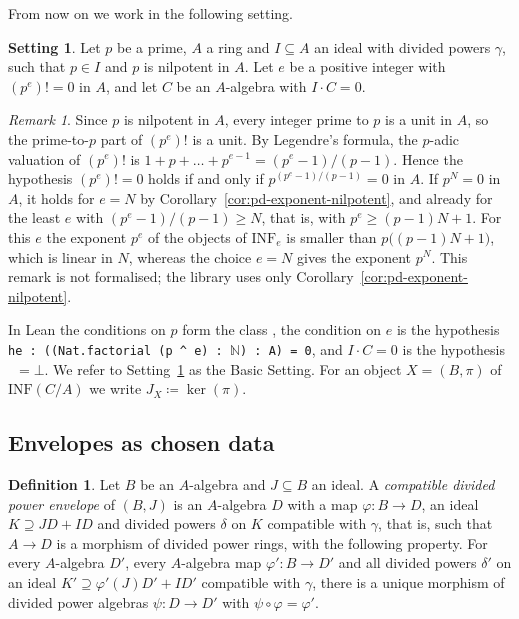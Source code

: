 \documentclass[11pt]{amsart}
\newcommand{\INF}{\mathrm{INF}}
\theoremstyle{plain}
\theoremstyle{definition}
\newtheorem{definition}[theorem]{Definition}
\newtheorem{setting}[theorem]{Setting}
\theoremstyle{remark}
\newtheorem{remark}[theorem]{Remark}
\begin{document}
From now on we work in the following setting.

\begin{setting}\label{Setting:s}
Let $p$ be a prime, $A$ a ring and $I \subseteq A$ an ideal with divided powers $\gamma$, such that $p \in I$ and $p$ is nilpotent in $A$. Let $e$ be a positive integer with $(p^e)! = 0$ in $A$, and let $C$ be an $A$-algebra with $I \cdot C = 0$.
\end{setting}

\begin{remark}\label{rem:valuation}
Since $p$ is nilpotent in $A$, every integer prime to $p$ is a unit in $A$, so the prime-to-$p$ part of $(p^e)!$ is a unit. By Legendre's formula, the $p$-adic valuation of $(p^e)!$ is $1 + p + \dots + p^{e-1} = (p^e-1)/(p-1)$. Hence the hypothesis $(p^e)! = 0$ holds if and only if $p^{(p^e-1)/(p-1)} = 0$ in $A$. If $p^N = 0$ in $A$, it holds for $e = N$ by Corollary~\ref{cor:pd-exponent-nilpotent}, and already for the least $e$ with $(p^e-1)/(p-1) \ge N$, that is, with $p^e \ge (p-1)N + 1$. For this $e$ the exponent $p^e$ of the objects of $\INF_e$ is smaller than $p\big((p-1)N + 1\big)$, which is linear in $N$, whereas the choice $e = N$ gives the exponent $p^N$. This remark is not formalised; the library uses only Corollary~\ref{cor:pd-exponent-nilpotent}.
\end{remark}

In Lean the conditions on $p$ form the class , the condition on $e$ is the hypothesis \texttt{he : ((Nat.factorial (p \textasciicircum{} e) : $\mathbb{N}$) : A) = 0}, and $I \cdot C = 0$ is the hypothesis ~$= \bot$. We refer to Setting~\ref{Setting:s} as the Basic Setting. For an object $X = (B, \pi)$ of $\INF(C/A)$ we write $J_X \coloneqq \ker(\pi)$.

\subsection{Envelopes as chosen data}

\begin{definition}\label{def:envelope}
Let $B$ be an $A$-algebra and $J \subseteq B$ an ideal. A \emph{compatible divided power envelope} of $(B,J)$ is an $A$-algebra $D$ with a map $\varphi \colon B \to D$, an ideal $K \supseteq JD + ID$ and divided powers $\delta$ on $K$ compatible with $\gamma$, that is, such that $A \to D$ is a morphism of divided power rings, with the following property. For every $A$-algebra $D'$, every $A$-algebra map $\varphi' \colon B \to D'$ and all divided powers $\delta'$ on an ideal $K' \supseteq \varphi'(J)D' + ID'$ compatible with $\gamma$, there is a unique morphism of divided power algebras $\psi \colon D \to D'$ with $\psi \circ \varphi = \varphi'$.
\end{definition}
\end{document}
